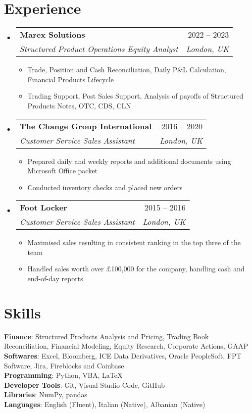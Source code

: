 \documentclass[letterpaper,11pt]{article}
\makeatletter
\newcommand{\resumeItem}[1]{
  \item\small{
    {#1 \vspace{-2pt}}
  }
}
\newcommand{\resumeSubheading}[4]{
  \vspace{-2pt}\item
    \begin{tabular*}{0.97\textwidth}[t]{l@{\extracolsep{\fill}}r}
      \textbf{#1} & #2 \\
      \textit{\small#3} & \textit{\small #4} \\
    \end{tabular*}\vspace{-7pt}
}
\newcommand{\resumeSubHeadingListStart}{\begin{itemize}[leftmargin=0.15in, label={}]}
\newcommand{\resumeSubHeadingListEnd}{\end{itemize}}
\newcommand{\resumeItemListStart}{\begin{itemize}}
\newcommand{\resumeItemListEnd}{\end{itemize}\vspace{-5pt}}
\makeatother
\begin{document}
\section{Experience}
  \resumeSubHeadingListStart

    \resumeSubheading
      {Marex Solutions}{2022 -- 2023}
      {Structured Product Operations Equity Analyst}{London, UK}
      \resumeItemListStart
        \resumeItem{Trade, Position and Cash Reconciliation, Daily P\&L Calculation, Financial Products Lifecycle}
        \resumeItem{Trading Support, Post Sales Support, Analysis of payoffs of Structured Products Notes, OTC, CDS, CLN}
      \resumeItemListEnd

    \resumeSubheading
      {The Change Group International}{2016 -- 2020}
      {Customer Service Sales Assistant}{London, UK}
      \resumeItemListStart
        \resumeItem{Prepared daily and weekly reports and additional documents using Microsoft Office packet}
        \resumeItem{Conducted inventory checks and placed new orders}
      \resumeItemListEnd

    \resumeSubheading
      {Foot Locker}{2015 -- 2016}
      {Customer Service Sales Assistant}{London, UK}
      \resumeItemListStart
        \resumeItem{Maximised sales resulting in consistent ranking in the top three of the team}
        \resumeItem{Handled sales worth over £100,000 for the company, handling cash and end-of-day reports}
    \resumeItemListEnd

   \resumeSubHeadingListEnd

\section{Skills}
 \begin{itemize}[leftmargin=0.15in, label={}]
    \small{\item{
     \textbf{Finance}{: Structured Products Analysis and Pricing, Trading Book Reconciliation, Financial Modeling, Equity Research, Corporate Actions, GAAP} \\
     \textbf{Softwares}{: Excel, Bloomberg, ICE Data Derivatives, Oracle PeopleSoft, FPT Software, Jira, Fireblocks and Coinbase} \\
     \textbf{Programming}{: Python, VBA, \LaTeX} \\
     \textbf{Developer Tools}{: Git, Visual Studio Code, GitHub} \\
     \textbf{Libraries}{: NumPy, pandas} \\
     \textbf{Languages}{: English (Fluent), Italian (Native), Albanian (Native)}
    }}
 \end{itemize}
\end{document}
